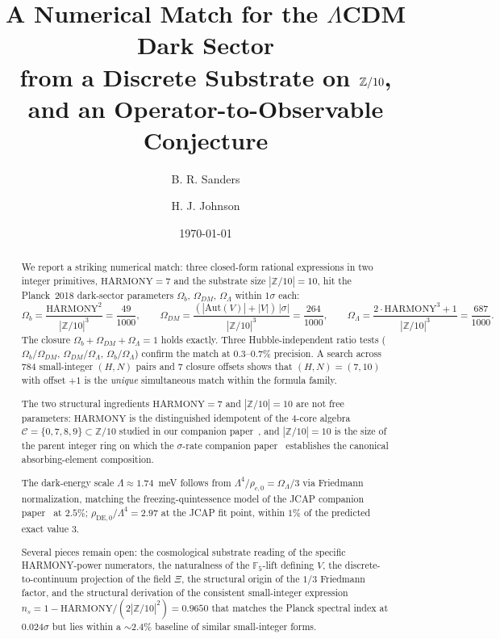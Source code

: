 \documentclass[11pt,reqno]{amsart}
\title[Dark-Sector Trinity from Z/10]
{A Numerical Match for the $\Lambda$CDM Dark Sector \\
 from a Discrete Substrate on $\Z/10$, \\
 and an Operator-to-Observable Conjecture}
\author{B. R. Sanders}
\author{H. J. Johnson}
\date{\today}
\theoremstyle{plain}
\theoremstyle{definition}
\theoremstyle{remark}
\newcommand{\Z}{\mathbb{Z}}
\newcommand{\F}{\mathbb{F}}
\newcommand{\Aut}{\mathrm{Aut}}
\begin{document}
\begin{abstract}
We report a striking numerical match: three closed-form rational
expressions in two integer primitives, $\mathrm{HARMONY} = 7$ and
the substrate size $|\Z/10| = 10$, hit the Planck~2018
dark-sector parameters
$\Omega_b$, $\Omega_{DM}$, $\Omega_\Lambda$ within $1\sigma$ each:
\[
  \Omega_b = \frac{\mathrm{HARMONY}^{2}}{|\Z/10|^{3}} = \frac{49}{1000},\qquad
  \Omega_{DM} = \frac{(|\Aut(V)| + |V|)\,|\sigma|}{|\Z/10|^{3}} = \frac{264}{1000},\qquad
  \Omega_\Lambda = \frac{2\cdot\mathrm{HARMONY}^{3} + 1}{|\Z/10|^{3}} = \frac{687}{1000}.
\]
The closure $\Omega_b + \Omega_{DM} + \Omega_\Lambda = 1$ holds
exactly. Three Hubble-independent ratio tests
($\Omega_b/\Omega_{DM}$, $\Omega_{DM}/\Omega_\Lambda$,
$\Omega_b/\Omega_\Lambda$) confirm the match at $0.3$--$0.7\%$
precision. A search across $784$ small-integer $(H, N)$ pairs and
$7$ closure offsets shows that $(H, N) = (7, 10)$ with offset
$+1$ is the \emph{unique} simultaneous match within the formula
family.

The two structural ingredients $\mathrm{HARMONY} = 7$ and
$|\Z/10| = 10$ are not free parameters: $\mathrm{HARMONY}$ is the
distinguished idempotent of the $4$-core algebra
$\mathcal{C} = \{0, 7, 8, 9\} \subset \Z/10$ studied in our
companion paper~\cite{SandersGish2026FourCore}, and
$|\Z/10| = 10$ is the size of the parent integer ring on which the
$\sigma$-rate companion paper~\cite{SandersGish2026SigmaRate}
establishes the canonical absorbing-element composition.

The dark-energy scale $\Lambda \approx 1.74$~meV follows from
$\Lambda^{4}/\rho_{c,0} = \Omega_\Lambda/3$ via Friedmann
normalization, matching the freezing-quintessence model of the
JCAP companion paper~\cite{SandersGish2026JCAP} at $2.5\%$;
$\rho_{\mathrm{DE},0}/\Lambda^{4} = 2.97$ at the JCAP fit point,
within $1\%$ of the predicted exact value $3$.

Several pieces remain open: the cosmological substrate reading of
the specific HARMONY-power numerators, the naturalness of the
$\F_5$-lift defining $V$, the discrete-to-continuum projection
of the field $\Xi$, the structural origin of the $1/3$ Friedmann
factor, and the structural derivation of the consistent
small-integer expression
$n_s = 1 - \mathrm{HARMONY}/(2|\Z/10|^{2}) = 0.9650$ that
matches the Planck spectral index at $0.024\sigma$ but lies
within a $\sim 2.4\%$ baseline of similar small-integer forms.


\end{abstract}
\end{document}

